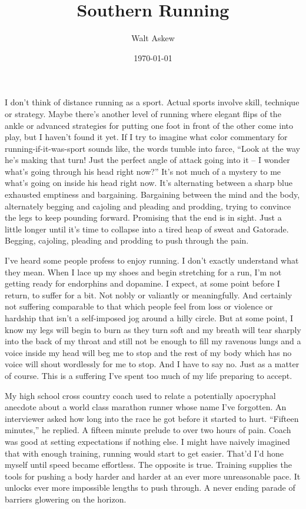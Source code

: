 \documentclass[12pt, oneside]{memoir}
\title{Southern Running}
\author{Walt Askew}
\date{\today}
\begin{document}
\maketitle

I don't think of distance running as a sport.
Actual sports involve skill, technique or strategy.
Maybe there's another level of running where elegant flips of the
ankle or advanced strategies for putting one foot in front of the
other come into play, but I haven't found it yet.
If I try to imagine what color commentary for running-if-it-was-sport
sounds like, the words tumble into farce,
``Look at the way he's making that turn! Just the perfect angle of
attack going into it -- I wonder what's going through his head right
now?''
It's not much of a mystery to me what's going on inside his head right
now. 
It's alternating between a sharp blue exhausted emptiness and
bargaining.
Bargaining between the mind and the body, alternately begging and
cajoling and pleading and prodding, trying to convince the legs to
keep pounding forward.
Promising that the end is in sight.
Just a little longer until it's time to collapse into a tired heap of
sweat and Gatorade. 
Begging, cajoling, pleading and prodding to push through the pain.

I've heard some people profess to enjoy running.
I don't exactly understand what they mean.
When I lace up my shoes and begin stretching for a run, I'm not
getting ready for endorphins and dopamine.
I expect, at some point before I return, to suffer for a bit.
Not nobly or valiantly or meaningfully.
And certainly not suffering comparable to that which people feel from
loss or violence or hardship that isn't a self-imposed jog around a
hilly circle.
But at some point, I know my legs will begin to burn as they turn
soft and my breath will tear sharply into the back of my throat and
still not be enough to fill my ravenous lungs and a voice inside my
head will beg me to stop and the rest of my body which has no voice
will shout wordlessly for me to stop.
And I have to say no.
Just as a matter of course.
This is a suffering I've spent too much of my life preparing to
accept.

My high school cross country coach used to relate a potentially
apocryphal anecdote about a world class marathon runner whose name
I've forgotten.
An interviewer asked how long into the race he got before it started
to hurt.
``Fifteen minutes,'' he replied.
A fifteen minute prelude to over two hours of pain.
Coach was good at setting expectations if nothing else.
I might have naively imagined that with enough training,
running would start to get easier.
That'd I'd hone myself until speed became effortless.
The opposite is true.
Training supplies the tools for pushing a body harder and harder at an
ever more unreasonable pace.
It unlocks ever more impossible lengths to push through.
A never ending parade of barriers glowering on the horizon.
\end{document}
